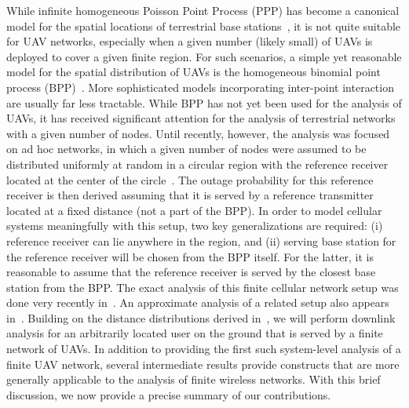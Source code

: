 \documentclass[journal,draftclsnofoot,onecolumn,12pt]{IEEEtran}
\begin{document}
While infinite homogeneous Poisson Point Process (PPP) has become a canonical model for the spatial locations of terrestrial base stations~\cite{tutorial_jeff}, it is not quite suitable for UAV networks, especially when a given number (likely small) of UAVs is deployed to cover a given finite region. For such scenarios, a simple yet reasonable model for the spatial distribution of UAVs is the homogeneous binomial point process (BPP)~\cite{haenggi2013stochastic,distbpp}. More sophisticated models incorporating inter-point interaction are usually far less tractable. While BPP has not yet been used for the analysis of UAVs, it has received significant attention for the analysis of terrestrial networks with a given number of nodes. Until recently, however, the analysis was focused on ad hoc networks, in which a given number of nodes were assumed to be distributed uniformly at random in a circular region with the reference receiver located at the center of the circle~\cite{zhang,venugopal,gong,valenti,durrani}. The outage probability for this reference receiver is then derived assuming that it is served by a reference transmitter located at a fixed distance (not a part of the BPP). In order to model cellular systems meaningfully with this setup, two key generalizations are required: (i) reference receiver can lie anywhere in the region, and (ii) serving base station for the reference receiver will be chosen from the BPP itself. For the latter, it is reasonable to assume that the reference receiver is served by the closest base station from the BPP. The exact analysis of this finite cellular network setup was done very recently in~\cite{mehrnazbpp}. An approximate analysis of a related setup also appears in~\cite{BanEckJ2015}. Building on the distance distributions derived in~\cite{mehrnazbpp,khaDurJ2013}, we will perform downlink analysis for an arbitrarily located user on the ground that is served by a finite network of UAVs. In addition to providing the first such system-level analysis of a finite UAV network, several intermediate results provide constructs that are more generally applicable to the analysis of finite wireless networks. With this brief discussion, we now provide a precise summary of our contributions.%
\end{document}
